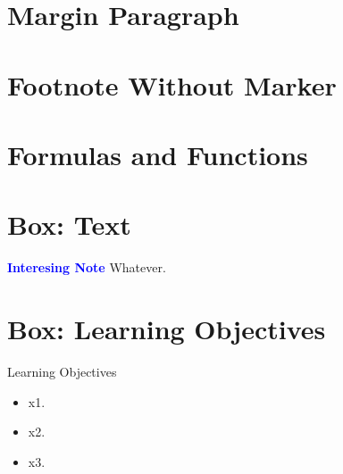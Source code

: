 \section{Margin Paragraph} 

\section{Footnote Without Marker} 

\section{Formulas and Functions}

\section{Box: Text}
\begin{tcolorbox}[colback=blue!5!white,colframe=blue!75!black]
	\textcolor{blue}{\textbf{Interesing Note}}
	\tcblower
	Whatever.
\end{tcolorbox}

\section{Box: Learning Objectives}
\begin{center}
	\begin{objbox}{Learning Objectives}
		\begin{itemize}
			\setlength{\itemsep}{0pt}
			\setlength{\parskip}{0pt}
			\setlength{\parsep}{0pt}
		
			\item x1.
			\item x2.
			\item x3.
		\end{itemize}
	\end{objbox}
\end{center}

